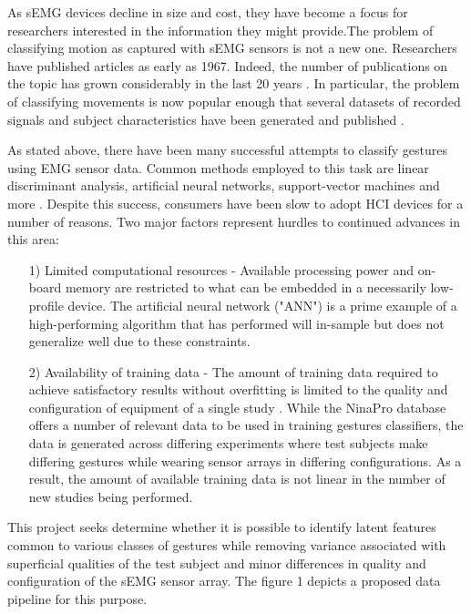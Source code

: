\documentclass[11pt]{article}
\begin{document}
\begin{enumerate}
As sEMG devices decline in size and cost, they have become a focus for researchers interested in the information they might provide.The problem of classifying motion as captured with sEMG sensors is not a new one. Researchers have published articles as early as 1967. Indeed, the number of publications on the topic has grown considerably in the last 20 years \cite{state}. In particular, the problem of classifying movements is now popular enough that several datasets of recorded signals and subject characteristics have been generated and published \cite{ninapro}.

As stated above, there have been many successful attempts to classify gestures  using EMG sensor data. Common methods employed to this task are linear discriminant analysis, artificial neural networks, support-vector machines and more \cite{state}. Despite this success, consumers have been slow to adopt HCI devices for a number of reasons. Two major factors represent hurdles to continued advances in this area:
\begin{enumerate}
\item[1)] Limited computational resources - Available processing power and on-board memory are restricted to what can be embedded in a necessarily low-profile device. The artificial neural network ("ANN") is a prime example of a high-performing algorithm that has performed will in-sample but does not generalize well due to these constraints.

\item[2)] Availability of training data - The amount of training data required to achieve satisfactory results without overfitting is limited to the quality and configuration of equipment of a single study \cite{bigdata}. While the NinaPro database offers a number of relevant data to be used in training gestures classifiers, the data is generated across differing experiments where test subjects make differing gestures while wearing sensor arrays in differing configurations. As a result, the amount of available training data is not linear in the number of new studies being performed.
\end{enumerate}

This project seeks determine whether it is possible to identify latent features common to various classes of gestures while removing variance associated with superficial qualities of the test subject and minor differences in quality and configuration of the sEMG sensor array. The figure 1 depicts a proposed data pipeline for this purpose.


\end{enumerate}
\end{document}
